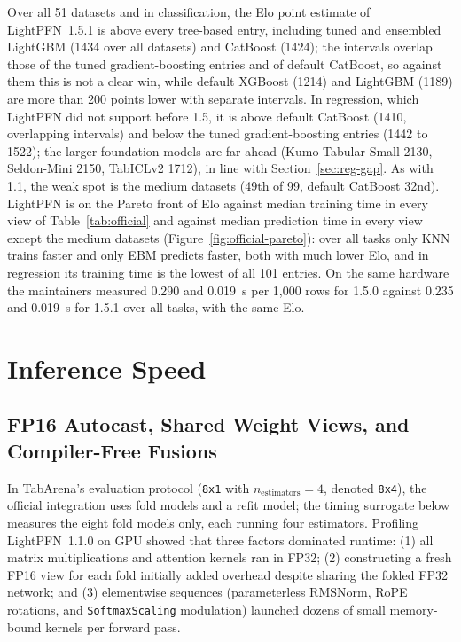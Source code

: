 \documentclass[11pt]{article}
\begin{document}
Over all 51 datasets and in classification, the Elo point estimate of LightPFN~1.5.1 is above every tree-based entry, including tuned and ensembled LightGBM (1434 over all datasets) and CatBoost (1424); the intervals overlap those of the tuned gradient-boosting entries and of default CatBoost, so against them this is not a clear win, while default XGBoost (1214) and LightGBM (1189) are more than 200 points lower with separate intervals. In regression, which LightPFN did not support before 1.5, it is above default CatBoost (1410, overlapping intervals) and below the tuned gradient-boosting entries (1442 to 1522); the larger foundation models are far ahead (Kumo-Tabular-Small 2130, Seldon-Mini 2150, TabICLv2 1712), in line with Section~\ref{sec:reg-gap}. As with 1.1, the weak spot is the medium datasets (49th of 99, default CatBoost 32nd).
LightPFN is on the Pareto front of Elo against median training time in every view of Table~\ref{tab:official} and against median prediction time in every view except the medium datasets (Figure~\ref{fig:official-pareto}): over all tasks only KNN trains faster and only EBM predicts faster, both with much lower Elo, and in regression its training time is the lowest of all 101 entries. On the same hardware the maintainers measured 0.290 and 0.019~s per 1,000 rows for 1.5.0 against 0.235 and 0.019~s for 1.5.1 over all tasks, with the same Elo.

\section{Inference Speed}
\label{sec:speed}

\subsection{FP16 Autocast, Shared Weight Views, and Compiler-Free Fusions}
\label{sec:gpu-speed}

In TabArena's evaluation protocol (\texttt{8x1} with $n_{\text{estimators}}=4$, denoted \texttt{8x4}), the official integration uses fold models and a refit model; the timing surrogate below measures the eight fold models only, each running four estimators.
Profiling LightPFN~1.1.0 on GPU showed that three factors dominated runtime: (1) all matrix multiplications and attention kernels ran in FP32; (2) constructing a fresh FP16 view for each fold initially added overhead despite sharing the folded FP32 network; and (3) elementwise sequences (parameterless RMSNorm, RoPE rotations, and \texttt{SoftmaxScaling} modulation) launched dozens of small memory-bound kernels per forward pass. %
\end{document}
